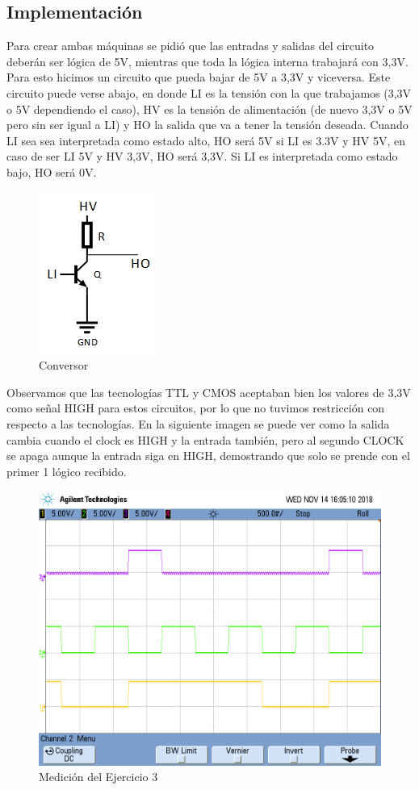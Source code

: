 \documentclass[10pt,a4paper]{article}
\begin{document}
\subsection*{Implementación}
Para crear ambas máquinas se pidió que las entradas y salidas del circuito deberán ser lógica de 5V, mientras que toda la lógica interna trabajará con 3,3V. Para esto hicimos un circuito que pueda bajar de 5V a 3,3V y viceversa. Este circuito puede verse abajo, en donde LI es la tensión con la que trabajamos (3,3V o 5V dependiendo el caso), HV es la tensión de alimentación (de nuevo 3,3V o 5V pero sin ser igual a LI) y HO la salida que va a tener la tensión deseada. Cuando LI sea sea interpretada como estado alto, HO será 5V si LI es 3.3V y HV 5V, en caso de ser LI 5V y HV 3,3V, HO será 3,3V. Si LI es interpretada como estado bajo, HO será 0V.

\begin{figure}[H]
	\centering
	\includegraphics[scale=1]{Imagenes/Conversor.jpg}
	\caption{Conversor}
\end{figure}

Observamos que las tecnologías TTL y CMOS aceptaban bien los valores de 3,3V como señal HIGH para estos circuitos, por lo que no tuvimos restricción con respecto a las tecnologías.
En la siguiente imagen se puede ver como la salida cambia cuando el clock es HIGH y la entrada también, pero al segundo CLOCK se apaga aunque la entrada siga en HIGH, demostrando que solo se prende con el primer 1 lógico recibido.
\begin{figure}[H]
	\centering
	\includegraphics[width=14cm]{Imagenes/MedicionTP3_Ej3.png}
	\caption{Medición del Ejercicio 3}
\end{figure}
\end{document}
